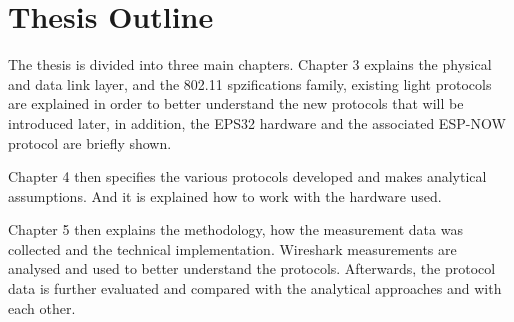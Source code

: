 \section*{Thesis Outline}

The thesis is divided into three main chapters.
Chapter 3 explains the physical and data link layer, and the 802.11 spzifications family,
existing light protocols are explained in order to better understand the new protocols that will be introduced later,
in addition, the EPS32 hardware and the associated ESP-NOW protocol are briefly shown.

Chapter 4 then specifies the various protocols developed and makes analytical assumptions.
And it is explained how to work with the hardware used.

Chapter 5 then explains the methodology, how the measurement data was collected and the technical implementation.
Wireshark measurements are analysed and used to better understand the protocols.
Afterwards, the protocol data is further evaluated and compared with the analytical approaches and with each other.